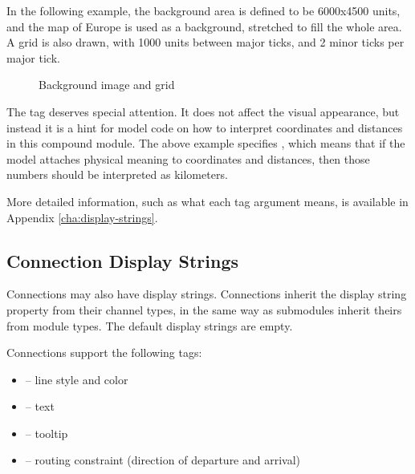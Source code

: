 In the following example, the background area is defined to be 6000x4500
units, and the map of Europe is used as a background, stretched to fill the
whole area. A grid is also drawn, with 1000 units between major ticks,
and 2 minor ticks per major tick.

\begin{ned}
network EuropePlayground
{
    @display("bgb=6000,4500;bgi=maps/europe,s;bgg=1000,2,grey95;bgu=km");
\end{ned}

\begin{figure}[htbp]
  \begin{center}
    \caption{Background image and grid}
    \label{fig:graphics-bgtags}
  \end{center}
\end{figure}

The  tag deserves special attention. It does not affect
the visual appearance, but instead it is a hint for model code
on how to interpret coordinates and distances in this compound
module. The above example specifies , which means
that if the model attaches physical meaning to coordinates and
distances, then those numbers should be interpreted as kilometers.

More detailed information, such as what each tag argument means, is
available in Appendix \ref{cha:display-strings}.


\subsection{Connection Display Strings}
\label{sec:graphics:connection-displaystrings}

Connections may also have display strings. Connections inherit the
display string property from their channel types, in the same way as
submodules inherit theirs from module types. The default display
strings are empty.

Connections support the following tags:

\begin{itemize}
  \item {} -- line style and color
  \item {} -- text
  \item {} -- tooltip
  \item {} -- routing constraint (direction of departure and arrival)
\end{itemize}

